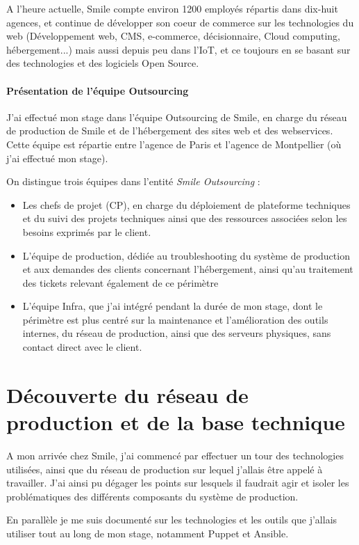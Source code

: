 \documentclass[14 pt]{extreport}
\begin{document}
A l'heure actuelle, Smile compte environ 1200 employés répartis dans dix-huit agences, et continue de développer son coeur de commerce sur les technologies du web (Développement web, CMS, e-commerce, décisionnaire, Cloud computing, hébergement...) mais aussi depuis peu dans l'IoT, et ce toujours en se basant sur des technologies et des logiciels Open Source.

\subsubsection{Présentation de l'équipe Outsourcing}

J'ai effectué mon stage dans l'équipe Outsourcing de Smile, en charge du réseau de production de Smile et de l'hébergement des sites web et des webservices. Cette équipe est répartie entre l'agence de Paris et l'agence de Montpellier (où j'ai effectué mon stage).

On distingue trois équipes dans l'entité \emph{Smile Outsourcing} :
\begin{itemize}
	\item Les chefs de projet (CP), en charge du déploiement de plateforme techniques et du suivi des projets techniques ainsi que des ressources associées selon les besoins exprimés par le client.
	\item L'équipe de production, dédiée au troubleshooting du système de production et aux demandes des clients concernant l'hébergement, ainsi qu'au traitement des tickets relevant également de ce périmètre
	\item L'équipe Infra, que j'ai intégré pendant la durée de mon stage, dont le périmètre est plus centré sur la maintenance et l'amélioration des outils internes, du réseau de production, ainsi que des serveurs physiques, sans contact direct avec le client.
\end{itemize}

\chapter{Découverte du réseau de production et de la base technique}

A mon arrivée chez Smile, j'ai commencé par effectuer un tour des technologies utilisées, ainsi que du réseau de production sur lequel j'allais être appelé à travailler. J'ai ainsi pu dégager les points sur lesquels il faudrait agir et isoler les problématiques des différents composants du système de production.

En parallèle je me suis documenté sur les technologies et les outils que j'allais utiliser tout au long de mon stage, notamment Puppet et Ansible.
\end{document}
